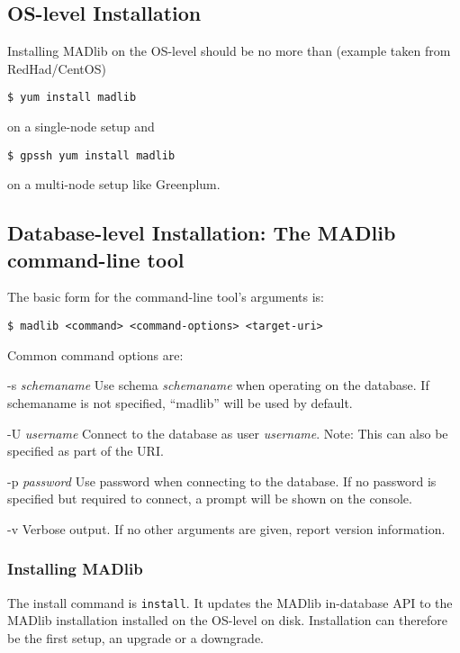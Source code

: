 \documentclass[11pt]{article}
\begin{document}
{\subsection{OS-level Installation}

	Installing MADlib on the OS-level should be no more than (example taken from RedHad/CentOS)
	\begin{lstlisting}
$ yum install madlib
	\end{lstlisting}
	on a single-node setup and
	\begin{lstlisting}
$ gpssh yum install madlib
	\end{lstlisting}
	on a multi-node setup like Greenplum.

\subsection{Database-level Installation: The MADlib command-line tool}


	The basic form for the command-line tool's arguments is:

	\begin{lstlisting}
$ madlib <command> <command-options> <target-uri>
	\end{lstlisting}
	
	Common command options are:
	\begin{ttdescription}
		\item[-s \textit{schemaname}] Use schema \textit{schemaname} when operating on the database. If schemaname is not specified, ``madlib'' will be used by default. 
		\item[-U \textit{username}] Connect to the database as user \textit{username}. Note: This can also be specified as part of the URI.
		\item[-p \textit{password}] Use password  when connecting to the database. If no password is specified but required to connect, a prompt will be shown on the console.
		\item[-v] Verbose output. If no other arguments are given, report version information.
	\end{ttdescription}

	\subsubsection{Installing MADlib}

		The install command is \texttt{install}. It updates the MADlib in-database API to the MADlib installation installed on the OS-level on disk. Installation can therefore be the first setup, an upgrade or a downgrade.

}
\end{document}
